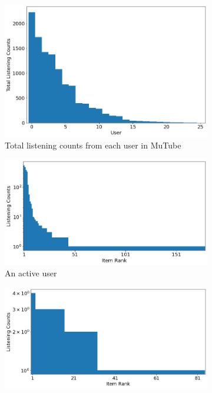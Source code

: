 \documentclass[a4paper,12pt]{report}
\begin{document}
\begin{figure}
    \begin{center}
        \begin{subfigure}{.78\textwidth}
            \centering
            \includegraphics[width=1\linewidth]{./images/Total Listening Counts Bar}
            \caption{Total listening counts from each user in MuTube}
            \label{fig:total_listen_counts}
        \end{subfigure}
        \begin{subfigure}{.78\textwidth}
            \centering
            \includegraphics[width=1\linewidth]{./images/user_2}
            \caption{An active user}
            \label{fig:act_user}
        \end{subfigure}
        \begin{subfigure}{.78\textwidth}
            \centering
            \includegraphics[width=1\linewidth]{./images/user_5}

\end{subfigure}
\end{center}
\end{figure}
\end{document}
